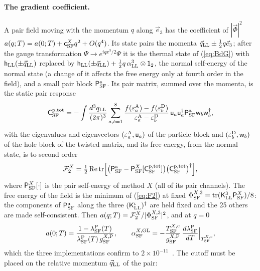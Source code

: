 \documentclass[aps,prd,twocolumn,superscriptaddress,nofootinbib,floatfix,longbibliography]{revtex4-2}
\newcommand{\LL}{{\rm LL}}
\newcommand{\SF}{{\rm SF}}
\newcommand{\tr}{\mathrm{tr}}
\begin{document}
\paragraph*{The gradient coefficient.}
A pair field moving with the momentum $q$ along $\vec e_3$ has the coefficient of $|\vec\Phi|^2$
$a(q;T)=a(0;T)+\mathsf c^X_\SF q^2+O(q^4)$. Its state pairs the momenta $\vec q_\LL\pm\frac12q\vec e_3$; after the gauge transformation
$\Psi\to e^{iqx^3/2}\Psi$ it is the thermal state of (\ref{eq:BdG}) with $\mathsf h_\LL(\pm\vec q_\LL)$ replaced by
$\mathsf h_\LL(\pm\vec q_\LL)+\frac12q\,\alpha^3_\LL\otimes\mathsf 1_2$, the normal self-energy of the normal state (a change of
it affects the free energy only at fourth order in the field), and a small pair block $\mathsf P^{\rm a}_\SF$. Its pair matrix,
summed over the momenta, is the static pair response
\begin{equation}
\mathsf C^{\rm p,tot}_\SF=-\int\frac{d^3q_\LL}{(2\pi)^3}\sum_{a,b=1}^8\frac{f(\varepsilon^{\rm A}_a)-f(\varepsilon^{\rm D}_b)}{\varepsilon^{\rm A}_a-\varepsilon^{\rm D}_b}\,\mathsf u_a\mathsf u_a^\dagger\mathsf P^{\rm a}_\SF\mathsf w_b\mathsf w_b^\dagger ,
\label{eq:chi}
\end{equation}
with the eigenvalues and eigenvectors $(\varepsilon^{\rm A}_a,\mathsf u_a)$ of the particle block and
$(\varepsilon^{\rm D}_b,\mathsf w_b)$ of the hole block of the twisted matrix, and its free energy, from the normal state, is to
second order
\begin{equation}
\mathcal F^X_2=\tfrac12\,{\rm Re}\,\tr\Big[\big(\mathsf P^{\rm a}_\SF-\mathsf P^X_\SF[\mathsf C^{\rm p,tot}_\SF]\big)\big(\mathsf C^{\rm p,tot}_\SF\big)^\dagger\Big],
\label{eq:F2}
\end{equation}
where $\mathsf P^X_\SF[\cdot]$ is the pair self-energy of method $X$ (all of its pair channels). The free energy of the field is
the minimum of (\ref{eq:F2}) at fixed $\Phi^{X,3}_\SF=\tr(\mathsf K^3_\LL\mathsf P^X_\SF)/8$: the components of $\mathsf P^{\rm a}_\SF$ along
the three $(\mathsf K^\iota_\LL)^\dagger$ are held fixed and the 25 others are made self-consistent. Then
$a(q;T)=\mathcal F^X_2/|\Phi^{X,3}_\SF|^2$, and at $q=0$
\begin{equation}
a(0;T)=\frac{1-\lambda^{\rm P}_\SF(T)}{\lambda^{\rm P}_\SF(T)\,g^{X,{\rm P}}_\SF},\qquad\alpha^{X,{\rm GL}}_\SF=-\frac{T^{X,{\rm c}}_\SF}{g^{X,{\rm P}}_\SF}\,\frac{d\lambda^{\rm P}_\SF}{dT}\Big|_{T^{X,{\rm c}}_\SF},
\label{eq:a0}
\end{equation}
which the three implementations confirm to $2\times10^{-11}$~\cite{SM}. The cutoff must be placed on the relative momentum $\vec q_\LL$ of the pair:
\end{document}
